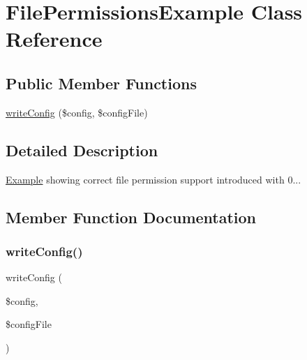 \hypertarget{classorg_1_1bovigo_1_1vfs_1_1example_1_1_file_permissions_example}{}\section{File\+Permissions\+Example Class Reference}
\label{classorg_1_1bovigo_1_1vfs_1_1example_1_1_file_permissions_example}
\subsection*{Public Member Functions}
\begin{DoxyCompactItemize}
\item 
\mbox{\hyperlink{classorg_1_1bovigo_1_1vfs_1_1example_1_1_file_permissions_example_ac309782eb2a62c352143d7bb1a8b4bf7}{write\+Config}} (\$config, \$config\+File)
\end{DoxyCompactItemize}


\subsection{Detailed Description}
\mbox{\hyperlink{classorg_1_1bovigo_1_1vfs_1_1example_1_1_example}{Example}} showing correct file permission support introduced with 0... 

\subsection{Member Function Documentation}
\mbox{\label{classorg_1_1bovigo_1_1vfs_1_1example_1_1_file_permissions_example_ac309782eb2a62c352143d7bb1a8b4bf7}} 
\subsubsection{\texorpdfstring{write\+Config()}{writeConfig()}}
{\footnotesize\ttfamily write\+Config (\begin{DoxyParamCaption}\item[{}]{\$config,  }\item[{}]{\$config\+File }\end{DoxyParamCaption})}

